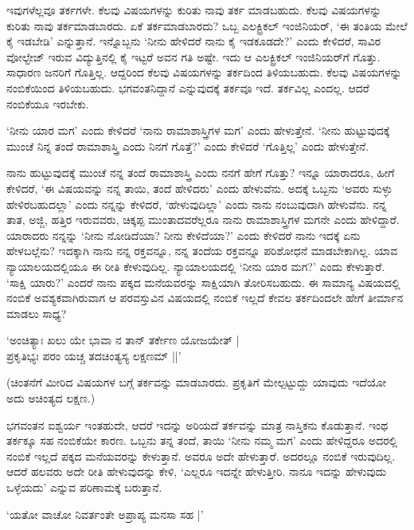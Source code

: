 ಇವುಗಳೆಲ್ಲವೂ ತರ್ಕಗಳೇ. ಕೆಲವು ವಿಷಯಗಳನ್ನು ಕುರಿತು ನಾವು ತರ್ಕ ಮಾಡಬಹುದು. ಕೆಲವು ವಿಷಯಗಳನ್ನು ಕುರಿತು ನಾವು ತರ್ಕಮಾಡಬಾರದು. ಏಕೆ ತರ್ಕಮಾಡಬಾರದು? ಒಬ್ಬ ಎಲಕ್ಟ್ರಿಕಲ್ ಇಂಜಿನಿಯರ್, `ಈ ತಂತಿಯ ಮೇಲೆ ಕೈ ಇಡಬೇಡಿ' ಎನ್ನುತ್ತಾನೆ. ಇನ್ನೊಬ್ಬನು `ನೀನು ಹೇಳಿದರೆ ನಾನು ಕೈ ಇಡಕೂಡದೇ?' ಎಂದು ಕೇಳಿದರೆ, ಸಾವಿರ ವೋಲ್ಟೇಜ್ ಇರುವ ವಿದ್ಯುತ್ತಿನಲ್ಲಿ ಕೈ ಇಟ್ಟರೆ ಅವನ ಗತಿ ಅಷ್ಟೇ. ಇದು ಆ ಎಲಕ್ಟ್ರಿಕಲ್ ಇಂಜಿನಿಯರ್‌ಗೆ ಗೊತ್ತು. ಸಾಧಾರಣ ಜನರಿಗೆ ಗೊತ್ತಿಲ್ಲ. ಆದ್ದರಿಂದ ಕೆಲವು ವಿಷಯಗಳನ್ನು ತರ್ಕದಿಂದ ತಿಳಿಯಬಹುದು. ಕೆಲವು ವಿಷಯಗಳನ್ನು ನಂಬಿಕೆಯಿಂದ ತಿಳಿಯಬಹುದು. ಭಗವಂತನಿದ್ದಾನೆ ಎನ್ನುವುದಕ್ಕೆ ತರ್ಕವೂ ಇದೆ. ತರ್ಕವಿಲ್ಲ ಎಂದಲ್ಲ. ಆದರೆ ನಂಬಿಕೆಯೂ ಇರಬೇಕು.

`ನೀನು ಯಾರ ಮಗ' ಎಂದು ಕೇಳಿದರೆ `ನಾನು ರಾಮಾಶಾಸ್ತ್ರಿಗಳ ಮಗ' ಎಂದು ಹೇಳುತ್ತೇನೆ. `ನೀನು ಹುಟ್ಟುವುದಕ್ಕೆ ಮುಂಚೆ ನಿನ್ನ ತಂದೆ ರಾಮಾಶಾಸ್ತ್ರಿ ಎಂದು ನಿನಗೆ ಗೊತ್ತೆ?' ಎಂದು ಕೇಳಿದರೆ `ಗೊತ್ತಿಲ್ಲ' ಎಂದು ಹೇಳುತ್ತೇನೆ.

ನಾನು ಹುಟ್ಟುವುದಕ್ಕೆ ಮುಂಚೆ ನನ್ನ ತಂದೆ ರಾಮಾಶಾಸ್ತ್ರಿ ಎಂದು ನನಗೆ ಹೇಗೆ ಗೊತ್ತು? ಇನ್ನೂ ಯಾರಾದರೂ, ಹೀಗೆ ಕೇಳಿದರೆ, `ಈ ವಿಷಯವನ್ನು ನನ್ನ ತಾಯಿ, ತಂದೆ ಹೇಳಿದರು' ಎಂದು ಹೇಳುವೆನು. ಅದಕ್ಕೆ ಒಬ್ಬನು `ಅವರು ಸುಳ್ಳು ಹೇಳಿರಬಹುದಲ್ಲಾ' ಎಂದು ನನ್ನನ್ನು ಕೇಳಿದರೆ, `ಹೇಳುವುದಿಲ್ಲಾ' ಎಂದು ನಾನು ನಂಬುವುದಾಗಿ ಹೇಳುವೆನು. ನನ್ನ ತಾತ, ಅಜ್ಜಿ, ಹತ್ತಿರ ಇರುವವರು, ಚಿಕ್ಕಪ್ಪ ಮುಂತಾದವರೆಲ್ಲರೂ ನಾನು ರಾಮಾಶಾಸ್ತ್ರಿಗಳ ಮಗನೇ ಎಂದು ಹೇಳಿದ್ದಾರೆ. ಯಾರಾದರು ನನ್ನನ್ನು `ನೀನು ನೋಡಿದೆಯಾ? ನೀನು ಕೇಳಿದೆಯಾ?' ಎಂದು ಕೇಳಿದರೆ ನಾನು ಇದಕ್ಕೆ ಏನು ಹೇಳಬಲ್ಲೆನು? ಇದಕ್ಕಾಗಿ ನಾನು ನನ್ನ ರಕ್ತವನ್ನೂ, ನನ್ನ ತಂದೆಯ ರಕ್ತವನ್ನೂ ಪರಿಶೋಧನೆ ಮಾಡಬೇಕಾಗಿಲ್ಲ. ಯಾವ ನ್ಯಾಯಾಲಯದಲ್ಲಿಯೂ ಈ ರೀತಿ ಕೇಳುವುದಿಲ್ಲ. ನ್ಯಾಯಾಲಯದಲ್ಲಿ `ನೀನು ಯಾರ ಮಗ?' ಎಂದು ಕೇಳುತ್ತಾರೆ. `ಸಾಕ್ಷಿ ಯಾರು?' ಎಂದರೆ ನಾನು ಪಕ್ಕದ ಮನೆಯವರನ್ನು ಸಾಕ್ಷಿಯಾಗಿ ತೋರಿಸಬಹುದು. ಈ ಸಾಮಾನ್ಯ ವಿಷಯದಲ್ಲಿ ನಂಬಿಕೆ ಅವಶ್ಯಕವಾಗಿರುವಾಗ ಆ ಪರವಸ್ತುವಿನ ವಿಷಯದಲ್ಲಿ ನಂಬಿಕೆ ಇಲ್ಲದೆ ಕೇವಲ ತರ್ಕದಿಂದಲೇ ಹೇಗೆ ತೀರ್ಮಾನ ಮಾಡಲು ಸಾಧ್ಯ?

\begin{shloka}
`ಅಂಚಿತ್ಯಾಃ ಖಲು ಯೇ ಭಾವಾ ನ ತಾನ್ ತರ್ಕೇಣ ಯೋಜಯೇತ್‌ |\\
ಪ್ರಕೃತಿಭ್ಯಃ ಪರಂ ಯಚ್ಚ ತದಚಿಂತ್ಯಸ್ಯ ಲಕ್ಷಣಮ್ ||'
\end{shloka}

(ಚಿಂತನೆಗೆ ಮೀರಿದ ವಿಷಯಗಳ ಬಗ್ಗೆ ತರ್ಕವನ್ನು ಮಾಡಬಾರದು. ಪ್ರಕೃತಿಗೆ ಮೇಲ್ಪಟ್ಟುದ್ದು ಯಾವುದು ಇದೆಯೋ ಅದು ಅಚಿಂತ್ಯದ ಲಕ್ಷಣ.)

ಭಗವಂತನ ಐಶ್ವರ್ಯ ಇಂತಹುದೇ, ಆದರೆ ಇದನ್ನು ಅರಿಯದೆ ತರ್ಕವನ್ನು ಮಾತ್ರ ನಾಸ್ತಿಕನು ಕೊಡುತ್ತಾನೆ. ಇಂಥ ತರ್ಕಕ್ಕೂ ಸಹ ನಂಬಿಕೆಯೇ ಕಾರಣ. ಒಬ್ಬನು ತನ್ನ ತಂದೆ, ತಾಯಿ `ನೀನು ನಮ್ಮ ಮಗ' ಎಂದು ಹೇಳಿದ್ದರೂ ಅದರಲ್ಲಿ ನಂಬಿಕೆ ಇಲ್ಲದೆ ಪಕ್ಕದ ಮನೆಯವರನ್ನು ಕೇಳುತ್ತಾನೆ. ಅವರೂ ಅದೇ ಹೇಳುತ್ತಾರೆ. ಅದರಲ್ಲೂ ನಂಬಿಕೆ ಇರುವುದಿಲ್ಲ. ಆದರೆ ಹಲವರು ಅದೇ ರೀತಿ ಹೇಳುವುದನ್ನು ಕೇಳಿ, `ಎಲ್ಲರೂ ಇದನ್ನೇ ಹೇಳುತ್ತೀರಿ. ನಾನೂ ಇದನ್ನು ಹೇಳುವುದು ಒಳ್ಳೆಯದು' ಎನ್ನುವ ಪರಿಣಾಮಕ್ಕೆ ಬರುತ್ತಾನೆ.

\begin{shloka}
`ಯತೋ ವಾಚೋ ನಿವರ್ತಂತೇ ಅಪ್ರಾಪ್ಯ ಮನಸಾ ಸಹ |'
\end{shloka}


